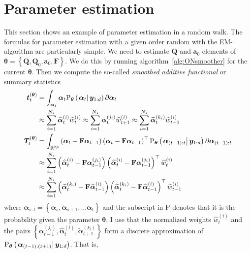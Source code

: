 \documentclass[9pt, notitlepage]{article}
\renewcommand{\vec}[1]{\bm{#1}}
\newcommand{\mat}[1]{\mathbf{#1}}
\newcommand{\Lbrace}[1]{\left\{ #1\right\}}
\newcommand{\Lparen}[1]{\left( #1\right)}
\newcommand{\Cond}[2]{\left. #1 \vphantom{#2} \right\vert  #2}
\newcommand{\Prob}{\text{P}}
\newcommand{\optor}[2]{#1\Lparen{#2}}
\newcommand{\optorC}[3]{\optor{#1}{\Cond{#2}{#3}}}
\newcommand{\partic}[3]{#1_{#2}^{\Lparen{#3}}}
\newcommand{\particB}[3]{\widetilde{#1}_{#2}^{\Lparen{#3}}}
\newcommand{\particS}[3]{\widehat{#1}_{#2}^{\Lparen{#3}}}
\newcommand{\dimState}{p}
\newcommand{\nPart}{N}
\newcommand{\nPeriods}{d}
\begin{document}
\section{Parameter estimation}
This section shows an example of parameter estimation in a random walk. The formulas for parameter estimation with a given order random with the EM-algorithm \citep{dempster77} are particularly simple. We need to estimate $\mat{Q}$ and $\vec{a}_0$ elements of $\vec{\theta} = \Lbrace{\mat{Q}, \mat{Q}_0, \vec{a}_0, \mat{F}}$. We do this by running algorithm~\ref{alg:ONsmoother} for the current $\vec{\theta}$. Then we compute the so-called \emph{smoothed additive functional} or summary statistics%
%
\begin{equation}\begin{split}
\vec{t}_t^{(\vec{\theta})} &= \int_{\vec{\alpha}_t} \vec{\alpha}_t
	\optorC{\Prob_{\vec{\theta}}}{\vec{\alpha}_t}{\vec{y}_{1:\nPeriods}} \partial \vec{\alpha}_t \\
%
& \approx \sum_{i = 1}^{\nPart_s} \particS{\vec{\alpha}}{t}{i} \particS{w}{t}{i}
\approx \sum_{i = 1}^{\nPart_s} \partic{\vec{\alpha}}{t}{j_i} \particS{w}{t + 1}{i}
\approx \sum_{i = 1}^{\nPart_s} \particB{\vec{\alpha}}{t}{k_i} \particS{w}{t-1}{i} \\
%
\vec{T}_t^{(\vec{\theta})} &= \int_{\mathbb{R}^{2\dimState}}
	\Lparen{\vec{\alpha}_t - \mat{F}\vec{\alpha}_{t-1}}
	\Lparen{\vec{\alpha}_t - \mat{F}\vec{\alpha}_{t-1}}^\top
	\optorC{\Prob_{\vec{\theta}}}{\vec{\alpha}_{(t-1):t}}{\vec{y}_{1:\nPeriods}}
	\partial \vec{\alpha}_{(t-1):t} \\
%
&\approx \sum_{i = 1}^{\nPart_s}
	\Lparen{\particS{\vec{\alpha}}{t}{i} - \mat{F}\partic{\vec{\alpha}}{t-1}{j_i}}
	\Lparen{\particS{\vec{\alpha}}{t}{i} - \mat{F}\partic{\vec{\alpha}}{t-1}{j_i}}^\top
	\particS{w}{t}{i} \\
%
&\approx \sum_{i = 1}^{\nPart_s}
	\Lparen{\particB{\vec{\alpha}}{t}{k_i} - \mat{F}\particS{\vec{\alpha}}{t-1}{i}}
	\Lparen{\particB{\vec{\alpha}}{t}{k_i} - \mat{F}\particS{\vec{\alpha}}{t-1}{i}}^\top
	\particS{w}{t-1}{i}
\end{split}\end{equation}%
%
%
where $\vec{\alpha}_{s:t} = \Lbrace{\vec{\alpha}_s, \vec{\alpha}_{s +1}, \dots \vec{\alpha}_t}$ and the subscript in $\Prob$ denotes that it is the probability given the parameter $\vec{\theta}$. I use that the normalized weights $\particS{w}{t}{i}$ and the pairs $\Lbrace{\partic{\vec{\alpha}}{t-1}{j_i}, \particS{\vec{\alpha}}{t}{i}, \particB{\vec{\alpha}}{t + 1}{k_i}}$ form a discrete approximation of $\optorC{\Prob_{\vec{\theta}}}{\vec{\alpha}_{(t-1):(t+1)}}{{\vec{y}_{1:\nPeriods}}}$. That is,%
\end{document}
